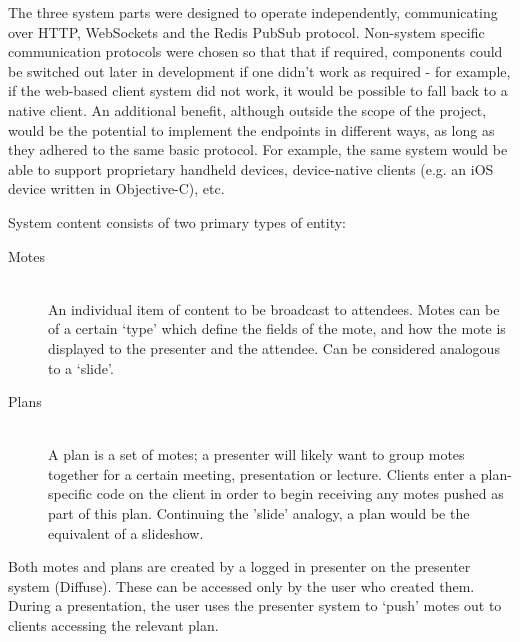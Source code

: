 \documentclass[a4papert,11pt,notitlepage]{article}
\begin{document}
The three system parts were designed to operate independently, communicating over HTTP, WebSockets and the Redis PubSub\cite{pubsub:web} protocol. Non-system specific communication protocols were chosen so that that if required, components could be switched out later in development if one didn't work as required - for example, if the web-based client system did not work, it would be possible to fall back to a native client. An additional benefit, although outside the scope of the project, would be the potential to implement the endpoints in different ways, as long as they adhered to the same basic protocol. For example, the same system would be able to support proprietary handheld devices, device-native clients (e.g. an iOS device written in Objective-C), etc.

System content consists of two primary types of entity:
\begin{description}
\item[Motes] \hfill \\
An individual item of content to be broadcast to attendees. Motes can be of a certain `type' which define the fields of the mote, and how the mote is displayed to the presenter and the attendee. Can be considered analogous to a `slide'.
\item[Plans] \hfill \\
A plan is a set of motes; a presenter will likely want to group motes together for a certain meeting, presentation or lecture. Clients enter a plan-specific code on the client in order to begin receiving any motes pushed as part of this plan. Continuing the 'slide' analogy, a plan would be the equivalent of a slideshow.
\end{description}

Both motes and plans are created by a logged in presenter on the presenter system (Diffuse). These can be accessed only by the user who created them. During a presentation, the user uses the presenter system to `push' motes out to clients accessing the relevant plan.
\end{document}
